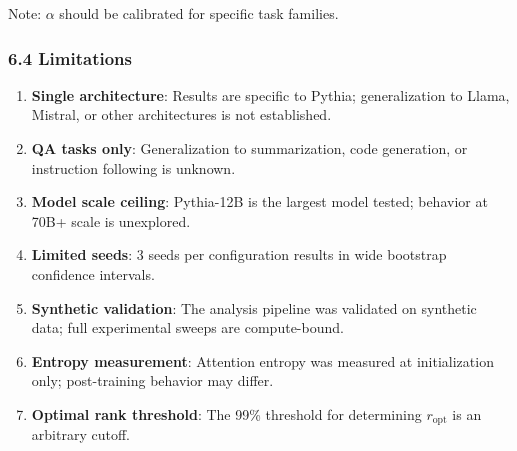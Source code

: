 Note: $\alpha$ should be calibrated for specific task families.

\subsubsection{6.4 Limitations}

\begin{enumerate}
\item \textbf{Single architecture}: Results are specific to Pythia; generalization to Llama, Mistral, or other architectures is not established.
\item \textbf{QA tasks only}: Generalization to summarization, code generation, or instruction following is unknown.
\item \textbf{Model scale ceiling}: Pythia-12B is the largest model tested; behavior at 70B+ scale is unexplored.
\item \textbf{Limited seeds}: 3 seeds per configuration results in wide bootstrap confidence intervals.
\item \textbf{Synthetic validation}: The analysis pipeline was validated on synthetic data; full experimental sweeps are compute-bound.
\item \textbf{Entropy measurement}: Attention entropy was measured at initialization only; post-training behavior may differ.
\item \textbf{Optimal rank threshold}: The 99\% threshold for determining $r_{\text{opt}}$ is an arbitrary cutoff.
\end{enumerate}
